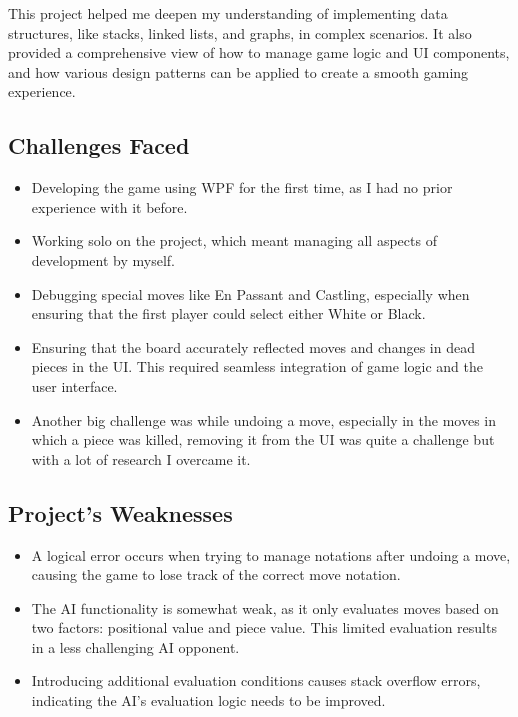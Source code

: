 \documentclass[a4paper,12pt]{article}
\begin{document}
This project helped me deepen my understanding of implementing data structures, like stacks, linked lists, and graphs, in complex scenarios. It also provided a comprehensive view of how to manage game logic and UI components, and how various design patterns can be applied to create a smooth gaming experience.

\subsection{Challenges Faced}
\begin{itemize}
    \item Developing the game using WPF for the first time, as I had no prior experience with it before.
    \item Working solo on the project, which meant managing all aspects of development by myself.
    \item Debugging special moves like En Passant and Castling, especially when ensuring that the first player could select either White or Black.
    \item Ensuring that the board accurately reflected moves and changes in dead pieces in the UI. This required seamless integration of game logic and the user interface.
    \item Another big challenge was while undoing a move, especially in the moves in which a piece was killed, removing it from the UI was quite a challenge but with a lot of research I overcame it. 
\end{itemize}

\subsection{Project's Weaknesses}
\begin{itemize}
    \item A logical error occurs when trying to manage notations after undoing a move, causing the game to lose track of the correct move notation.
    \item The AI functionality is somewhat weak, as it only evaluates moves based on two factors: positional value and piece value. This limited evaluation results in a less challenging AI opponent.
    \item Introducing additional evaluation conditions causes stack overflow errors, indicating the AI’s evaluation logic needs to be improved.
\end{itemize}
\end{document}
